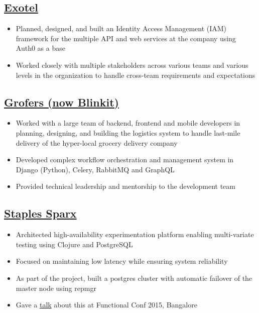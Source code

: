 \documentclass[11pt,a4paper]{article}
\begin{document}
\subsection*{\href{https://exotel.com}{Exotel}}
\begin{itemize}
    \item Planned, designed, and built an Identity Access Management (IAM) framework for the multiple API and web services at the company using Auth0 as a base
    \item Worked closely with multiple stakeholders across various teams and various levels in the organization to handle cross-team requirements and expectations
\end{itemize}

\subsection*{\href{https://blinkit.com}{Grofers (now Blinkit)}}
\begin{itemize}
    \item Worked with a large team of backend, frontend and mobile developers in planning, designing, and building the logistics system to handle last-mile delivery of the hyper-local grocery delivery company
    \item Developed complex workflow orchestration and management system in Django (Python), Celery, RabbitMQ and GraphQL
    \item Provided technical leadership and mentorship to the development team
\end{itemize}

\subsection*{\href{https://www.staples.com/}{Staples Sparx}}
\begin{itemize}
    \item Architected high-availability experimentation platform enabling multi-variate testing using Clojure and PostgreSQL
    \item Focused on maintaining low latency while ensuring system reliability
    \item As part of the project, built a postgres cluster with automatic failover of the master node using repmgr
    \item Gave a \href{https://www.youtube.com/watch?v=YjfXhhxw9Bs&ab_channel=nilenso}{talk} about this at Functional Conf 2015, Bangalore
\end{itemize}
\end{document}
